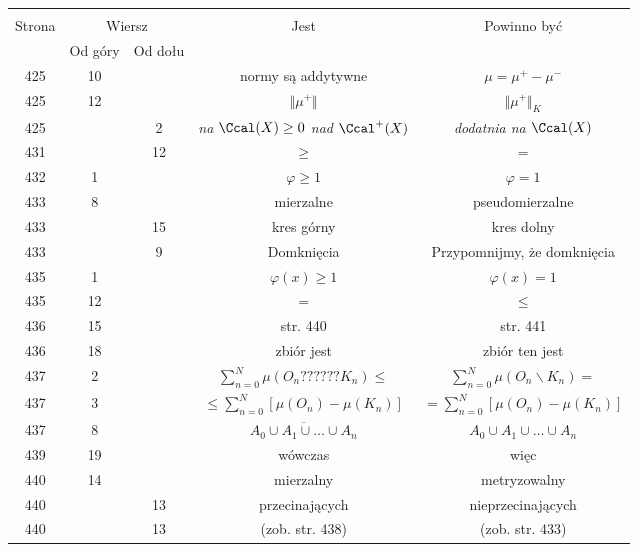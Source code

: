 \documentclass[a4paper,11pt]{article}
\numberwithin{equation}{section}
\begin{document}
\begin{center}
  \begin{tabular}{|c|c|c|c|c|}
    \hline
    & \multicolumn{2}{c|}{} & & \\
    Strona & \multicolumn{2}{c|}{Wiersz} & Jest
                              & Powinno być \\ \cline{2-3}
    & Od góry & Od dołu & & \\
    \hline
    425 & 10 & & normy są addytywne & $\mu = \mu^{ + } - \mu^{ - }$ \\
    425 & 12 & & $\Vert \mu^{ + } \Vert$ & $\Vert \mu^{ + } \Vert_{ K }$ \\
    425 & &  2 & \textit{na $\Ccal( X ) \geq 0$ nad $\Ccal^{ + }( X )$}
           & \textit{dodatnia na $\Ccal( X )$} \\
    431 & & 12 & $\geq$ & $=$ \\
    432 &  1 & & $\varphi \geq 1$ & $\varphi = 1$ \\
    433 &  8 & & mierzalne & pseudomierzalne \\
    433 & & 15 & kres górny & kres dolny \\
    433 & &  9 & Domknięcia & Przypomnijmy, że domknięcia \\
    435 &  1 & & $\varphi( x ) \geq 1$ & $\varphi( x ) = 1$ \\
    435 & 12 & & $=$ & $\leq$ \\
    436 & 15 & & str. 440 & str. 441 \\
    436 & 18 & & zbiór jest & zbiór ten jest \\
    437 &  2 & & $\sum\limits^{ N }_{ n = 0 } \mu( O_{ n } ??????
                 K_{ n } ) \leq$
           & $\sum\limits^{ N }_{ n = 0 } \mu( O_{ n } \backslash K_{ n } ) =$ \\
    437 &  3 & & $\leq \sum\limits^{ N }_{ n = 0 } [ \mu( O_{ n } )
                 - \mu( K_{ n } ) ]$
           & $= \sum\limits^{ N }_{ n = 0 } [ \mu( O_{ n } )
             - \mu( K_{ n } ) ]$ \\
    437 &  8 & & $\overline{ A_{ 0 } \cup A_{ 1 } \cup \ldots \cup A_{ n } }$
           & $A_{ 0 } \cup A_{ 1 } \cup \ldots \cup A_{ n }$ \\
    439 & 19 & & wówczas & więc \\
    440 & 14 & & mierzalny & metryzowalny \\
    440 & & 13 & przecinających & nieprzecinających \\
    440 & & 13 & (zob. str. 438) & (zob. str. 433) \\

\end{tabular}
\end{center}
\end{document}
